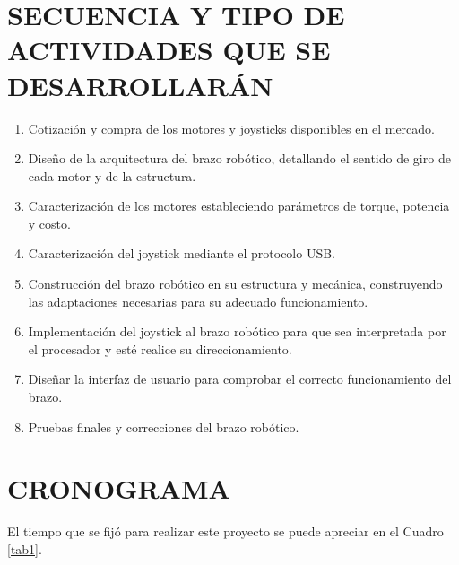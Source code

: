 \documentclass[10pt,graphicx,caption,rotating]{article}
\begin{document}
\section{SECUENCIA Y TIPO DE ACTIVIDADES QUE SE DESARROLLARÁN}
\noindent
\begin{enumerate}
\item Cotización y compra de los motores y joysticks disponibles en el mercado.
\item Diseño de la arquitectura del brazo robótico, detallando el sentido de giro de cada motor y de la estructura.
\item Caracterización de los motores estableciendo parámetros de torque, potencia y costo.
\item Caracterización del joystick mediante el protocolo USB.
\item Construcción del brazo robótico en su estructura y mecánica, construyendo las adaptaciones necesarias para su adecuado funcionamiento.
\item Implementación del joystick al brazo robótico para que sea interpretada por el procesador y esté realice su direccionamiento.
\item Diseñar la interfaz de usuario para comprobar el correcto funcionamiento del brazo.
\item Pruebas finales y correcciones del brazo robótico.
\end{enumerate}

\section{CRONOGRAMA}
\noindent
El tiempo que se fijó para realizar este proyecto se puede apreciar en el Cuadro \ref{tab1}.
\end{document}
